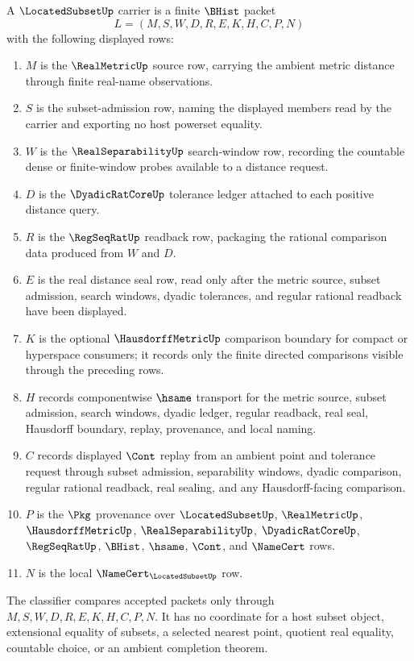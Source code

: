 \begin{definition}
\label{def:located-subset-carrier}
A $\LocatedSubsetUp$ carrier is a finite $\BHist$ packet
$$
L=(M,S,W,D,R,E,K,H,C,P,N)
$$
with the following displayed rows:
\begin{enumerate}
\item $M$ is the $\RealMetricUp$ source row, carrying the ambient metric distance through finite real-name observations.
\item $S$ is the subset-admission row, naming the displayed members read by the carrier and exporting no host powerset equality.
\item $W$ is the $\RealSeparabilityUp$ search-window row, recording the countable dense or finite-window probes available to a distance request.
\item $D$ is the $\DyadicRatCoreUp$ tolerance ledger attached to each positive distance query.
\item $R$ is the $\RegSeqRatUp$ readback row, packaging the rational comparison data produced from $W$ and $D$.
\item $E$ is the real distance seal row, read only after the metric source, subset admission, search windows, dyadic tolerances, and regular rational readback have been displayed.
\item $K$ is the optional $\HausdorffMetricUp$ comparison boundary for compact or hyperspace consumers; it records only the finite directed comparisons visible through the preceding rows.
\item $H$ records componentwise $\hsame$ transport for the metric source, subset admission, search windows, dyadic ledger, regular readback, real seal, Hausdorff boundary, replay, provenance, and local naming.
\item $C$ records displayed $\Cont$ replay from an ambient point and tolerance request through subset admission, separability windows, dyadic comparison, regular rational readback, real sealing, and any Hausdorff-facing comparison.
\item $P$ is the $\Pkg$ provenance over $\LocatedSubsetUp$, $\RealMetricUp$, $\HausdorffMetricUp$, $\RealSeparabilityUp$, $\DyadicRatCoreUp$, $\RegSeqRatUp$, $\BHist$, $\hsame$, $\Cont$, and $\NameCert$ rows.
\item $N$ is the local $\NameCert_{\LocatedSubsetUp}$ row.
\end{enumerate}
The classifier compares accepted packets only through $M,S,W,D,R,E,K,H,C,P,N$. It has no coordinate for a host subset object, extensional equality of subsets, a selected nearest point, quotient real equality, countable choice, or an ambient completion theorem.
\end{definition}

